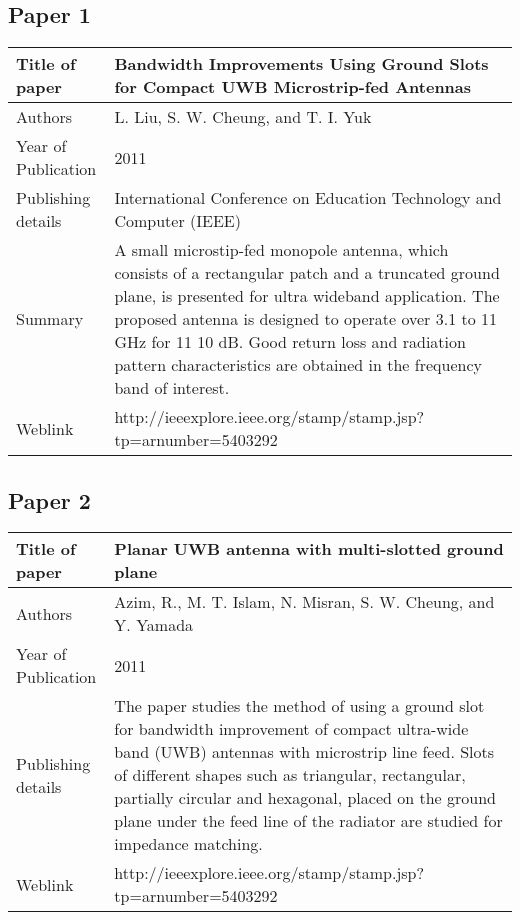 \documentclass[12pt]{article}
\begin{document}
	
  \subsection{Paper 1}
	\begin{center}
		   \begin{table}[h]
		   	
		   	\begin{tabular}{ |l|p{11cm}| }
		   		\hline
		   		Title of paper &  Bandwidth Improvements Using Ground Slots for Compact UWB Microstrip-fed Antennas \\
		   		\hline
		   		Authors & L. Liu, S. W. Cheung, and T. I. Yuk \\
		   		\hline
		   		Year of Publication & 2011 \\
		   		\hline
		   		Publishing details & International Conference on Education Technology and Computer (IEEE) \\ \hline
		   		Summary & A small microstip-fed monopole antenna, which consists of a rectangular patch and a truncated ground plane, is presented for ultra wideband application. The proposed antenna is designed to operate over 3.1 to 11 GHz for 11 10 dB. Good return loss and radiation pattern characteristics are obtained in the frequency band of interest.\\
		   		\hline
		   		Weblink & http://ieeexplore.ieee.org/stamp/stamp.jsp?tp=arnumber=5403292 \\
		   		\hline			 
		   	\end{tabular}	
		   	
		   \end{table}
	\end{center}
 
	\subsection{Paper 2}
	 \begin{center}
	 	\begin{table}[h]
	 		\centering
	 		\begin{tabular}{ |l|p{11cm}| }
	 			\hline
	 			Title of paper &  Planar UWB antenna with multi-slotted ground plane \\
	 			\hline
	 			Authors & Azim, R., M. T. Islam, N. Misran, S. W. Cheung, and Y. Yamada \\
	 			\hline
	 			Year of Publication & 2011 \\
	 			\hline
	 			Publishing details & The paper studies the method of using a ground slot for bandwidth improvement of compact ultra-wide band (UWB) antennas with microstrip line feed. Slots of different shapes such as triangular, rectangular, partially circular and hexagonal, placed on the ground plane under the feed line of the radiator are studied for impedance matching.\\
	 			\hline
	 			Weblink & http://ieeexplore.ieee.org/stamp/stamp.jsp?tp=arnumber=5403292 \\
	 			\hline			 
	 		\end{tabular}		
	 		
	 	\end{table}
	 \end{center}
	 
\end{document}

